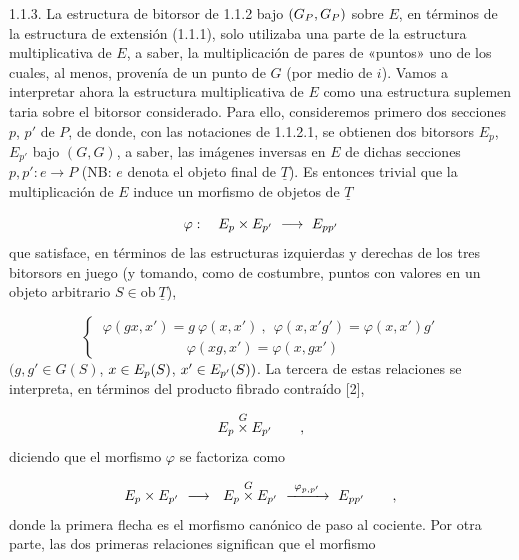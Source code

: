 \par\medskip\noindent
1.1.3.  La estructura de bitorsor de 1.1.2 bajo
$(\sisi{G_P}{G_P},\sisi{G_P}{G_P})$ sobre
$E$, en términos de la estructura de extensión (1.1.1), solo utilizaba
una parte de la estructura multiplicativa de $E$, a saber, la
multiplicación de pares de «puntos» uno de los cuales, al menos,
provenía de un punto de $G$ (por medio de $i$). Vamos a interpretar
ahora la estructura multiplicativa de $E$ como una estructura suplemen
taria sobre el bitorsor considerado. Para ello, consideremos primero
dos secciones $p$, $p'$ de $P$, de donde, con las notaciones de
1.1.2.1, se obtienen dos bitorsors $E_p$, $E_{p'}$ bajo $(G,G)$, a
saber, las imágenes inversas en $E$ de dichas secciones
$p,p' : e \longrightarrow P$ (NB: $e$ denota el objeto final de
$\underline{T}$). Es entonces trivial que la multiplicación de $E$
induce un morfismo de objetos de $\underline{T}$

\begin{equation*}
\varphi : \quad \sisi{P_p}{E_p} \times \sisi{P_{p'}}{E_{p'}}
\ \longrightarrow\ \sisi{P_{pp'}}{E_{pp'}}
\end{equation*}
que satisface, en términos de las estructuras izquierdas y derechas de
los tres bitorsors en juego (y tomando, como de costumbre, puntos con
valores en un objeto arbitrario
$S \in \mathrm{ob}\ \underline{T}$),

\begin{equation}\tag{1.1.3.0}
\left\{\ \begin{array}{l} \varphi(gx,x') = g\ \varphi(x,x')\ ,\ \ \varphi(x,x'g') = \varphi(x,x')g' \\[3ex] \qquad\qquad\qquad \varphi(xg,x') = \varphi(x,gx') \end{array}\right.
\end{equation}
$(g,g' \in G(S)$, $x \in \sisi{P_p}{E_p}(S)$,
$x' \in \sisi{P_{p'}}{E_{p'}}(S))$. La tercera de estas relaciones se
interpreta, en términos del producto fibrado contraído [2],

\begin{equation*}
\sisi{P_p}{E_p} \overset{G}{\times} \sisi{P_{p'}}{E_{p'}} \qquad ,
\end{equation*}
diciendo que el morfismo $\varphi$ se factoriza como

\begin{equation*}
\sisi{P_p}{E_p} \times \sisi{P_{p'}}{E_{p'}} \ \longrightarrow\
\ \sisi{P_p}{E_p} \overset{G}{\times} \sisi{P_{p'}}{E_{p'}}
\ \xrightarrow{\ \varphi_{p,p'}\ }\ \sisi{P_{pp'}}{E_{pp'}}
\qquad ,
\end{equation*}
donde la primera flecha es el morfismo canónico de paso al cociente.
Por otra parte, las dos primeras relaciones significan que el morfismo

